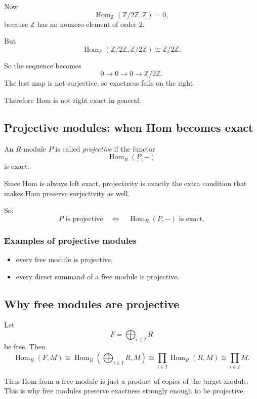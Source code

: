 \documentclass[12pt,a4paper]{article}
\theoremstyle{notespace}
\theoremstyle{definition}
\begin{document}
Now
\[
\operatorname{Hom}_{\mathbb Z}(\mathbb Z/2\mathbb Z,\mathbb Z)=0,
\]
because \(\mathbb Z\) has no nonzero element of order \(2\).

But
\[
\operatorname{Hom}_{\mathbb Z}(\mathbb Z/2\mathbb Z,\mathbb Z/2\mathbb Z)\cong \mathbb Z/2\mathbb Z.
\]

So the sequence becomes
\[
0 \longrightarrow 0 \longrightarrow 0 \longrightarrow \mathbb Z/2\mathbb Z.
\]
The last map is not surjective, so exactness fails on the right.

Therefore Hom is not right exact in general.

\subsection{ Projective modules: when Hom becomes exact}

An \(R\)-module \(P\) is called \emph{projective} if the functor
\[
\operatorname{Hom}_R(P,-)
\]
is exact.

Since Hom is always left exact, projectivity is exactly the extra condition that makes Hom preserve surjectivity as well.

So:
\[
P\text{ is projective}
\quad\Longleftrightarrow\quad
\operatorname{Hom}_R(P,-)\text{ is exact.}
\]

\subsubsection*{Examples of projective modules}

\begin{itemize}
	\item every free module is projective,
	\item every direct summand of a free module is projective.
\end{itemize}

\subsection{ Why free modules are projective}

Let
\[
F=\bigoplus_{i\in I} R
\]
be free.
Then
\[
\operatorname{Hom}_R(F,M)
\cong
\operatorname{Hom}_R\left(\bigoplus_{i\in I}R,M\right)
\cong
\prod_{i\in I}\operatorname{Hom}_R(R,M)
\cong
\prod_{i\in I} M.
\]

Thus Hom from a free module is just a product of copies of the target module.
This is why free modules preserve exactness strongly enough to be projective.
\end{document}
